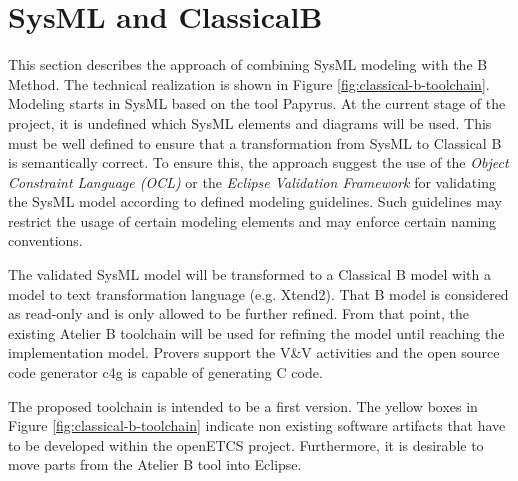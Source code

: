 \chapter{SysML and ClassicalB}
\label{sec:sysML-B}

This section describes the approach of combining SysML modeling with
the B Method. The technical realization is shown in Figure
\ref{fig:classical-b-toolchain}. Modeling starts in SysML based on the
tool Papyrus. At the current stage of the project, it is undefined
which SysML elements and diagrams will be used. This must be well
defined to ensure that a transformation from SysML to Classical B is
semantically correct. To ensure this, the approach suggest the use of
the \emph{Object Constraint Language (OCL)} or the \emph{Eclipse
  Validation Framework} for validating the SysML model according to
defined modeling guidelines. Such guidelines may restrict the usage of
certain modeling elements and may enforce certain naming conventions.

The validated SysML model will be transformed to a Classical B model
with a model to text transformation language (e.g. Xtend2). That B
model is considered as read-only and is only allowed to be further
refined. From that point, the existing Atelier B toolchain will be
used for refining the model until reaching the implementation
model. Provers support the V\&V activities and the open source code
generator c4g is capable of generating C code.

The proposed toolchain is intended to be a first version. The yellow
boxes in Figure \ref{fig:classical-b-toolchain} indicate non existing
software artifacts that have to be developed within the openETCS
project. Furthermore, it is desirable to move parts from the Atelier B
tool into Eclipse. 

